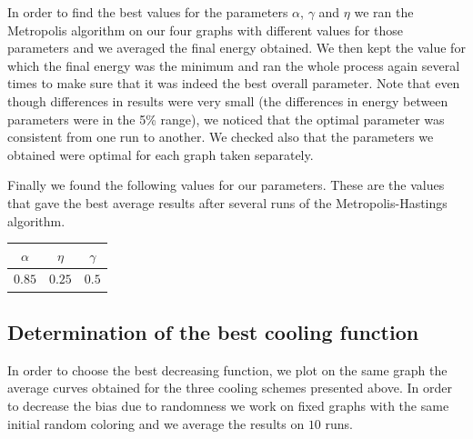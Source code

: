 \documentclass[a4paper]{article}
\begin{document}
In order to find the best values for the parameters $\alpha$, $\gamma$ and $\eta$ we ran the Metropolis algorithm on our four graphs with different values for those parameters and we averaged the final energy obtained. We then kept the value for which the final energy was the minimum and ran the whole process again several times to make sure that it was indeed the best overall parameter. Note that even though differences in results were very small (the differences in energy between parameters were in the 5\% range), we noticed that the optimal parameter was consistent from one run to another. We checked also that the parameters we obtained were optimal for each graph taken separately.

Finally we found the following values for our parameters. These are the values that gave the best average results after several runs of the Metropolis-Hastings algorithm.

\begin{center}
\begin{tabular}{|c|c|c|}
\hline 
$\alpha$ & $\eta$ & $\gamma$ \\ 
\hline 
$0.85$ & $0.25$ & $0.5$ \\ 
\hline 
\end{tabular} 
\end{center}

\subsection{Determination of the best cooling function}

In order to choose the best decreasing function, we plot on the same graph the average curves obtained for the three cooling schemes presented above. In order to decrease the bias due to randomness we work on fixed graphs with the same initial random coloring and we average the results on $10$ runs.
\end{document}
